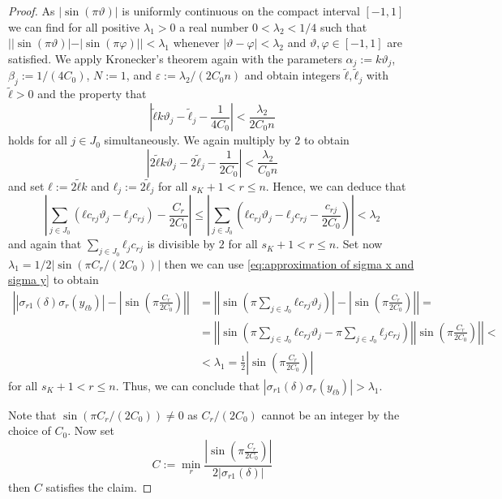 \begin{proof}
  As \(|\sin(π ϑ)|\) is uniformly continuous on the compact interval \([-1, 1]\)
  we can find for all positive \(λ_1 > 0\) a real number \(0 < λ_2 < 1/4\) such
  that \(||\sin(π ϑ)| - |\sin(π φ)|| < λ_1\) whenever \(|ϑ - φ| < λ_2\) and
  \(ϑ, φ ∈ [-1, 1]\) are satisfied. We apply Kronecker's theorem again with the
  parameters \(α_j := k ϑ_j\), \(β_j := 1/(4 C_0)\), \(N := 1\), and \(ε := λ_2
  / (2 C_0 n)\) and obtain integers \(\tilde{ℓ}, \tilde{ℓ}_j\) with \(\tilde{ℓ}
  > 0\) and the property that
  \[
    \left\vert \tilde{ℓ} k ϑ_j - \tilde{ℓ}_j - \frac{1}{4 C_0}\right\vert
     < \frac{λ_2}{2 C_0 n}
  \]
  holds for all \(j ∈ J_0\) simultaneously. We again multiply by \(2\) to obtain
  \[
  \left\vert 2 \tilde{ℓ} k ϑ_j - 2 \tilde{ℓ}_j - \frac{1}{2 C_0}\right\vert
    < \frac{λ_2}{C_0 n}
  \]
  and set \(ℓ := 2 \tilde{ℓ} k\) and \(ℓ_j := 2 \tilde{ℓ}_j\) for all \(s_K + 1
  < r ≤ n\). Hence, we can deduce that
  \[
    \left|
      \sum_{j ∈ J_0} \left( ℓ c_{rj} ϑ_j - ℓ_j c_{rj}\right) - \frac{C_r}{2 C_0}
    \right| ≤
    \left|
      \sum_{j ∈ J_0}
        \left( ℓ c_{rj} ϑ_j - ℓ_j c_{rj} - \frac{c_{rj}}{2 C_0}\right)
    \right| < λ_2
  \]
  and again that \(\sum_{j ∈ J_0}ℓ_j c_{rj}\) is divisible by \(2\) for all
  \(s_K + 1 < r ≤ n\). Set now \(λ_1 = 1/2 | \sin(π C_r / (2 C_0))|\) then we
  can use \eqref{eq:approximation of sigma x and sigma y} to obtain
  \begin{align*}
    \left\vert
      |σ_{r1}(δ) σ_r (y_{ℓb})| -
        \left| \sin\left( π \frac{C_r}{2 C_0} \right)\right|
    \right\vert &=
      \left|\left|
          \sin \left(π \sum_{j ∈ J_0} ℓ c_{rj} ϑ_j \right)
        \right| -
        \left\vert \sin\left( π \frac{C_r}{2 C_0} \right)\right\vert
       \right\vert=\\
      &= \left|\left| \sin \left(π \sum_{j ∈ J_0} ℓ c_{rj} ϑ_j  -
              π \sum_{j ∈ J_0}ℓ_j c_{rj}\right)
          \right|
          \left\vert \sin\left( π \frac{C_r}{2 C_0} \right)\right\vert
        \right| <\\
      &< λ_1 = \frac{1}{2} \left| \sin \left( π \frac{C_r}{2 C_0}\right)\right|
  \end{align*}
  for all \(s_K + 1 < r ≤ n\). Thus, we can conclude that \(|σ_{r1}(δ) σ_r
  (y_{ℓb})| > λ_1\).

  Note that \(\sin(π C_r / (2 C_0)) ≠ 0\) as \(C_r / (2 C_0)\) cannot be an
  integer by the choice of \(C_0\). Now set
  \[
    C :=
      \min_{r}
        \frac{\left|
          \sin \left(π \frac{C_r}{2 C_0}\right)
        \right|}{2 |σ_{r1}(δ)|}
  \]
  then \(C\) satisfies the claim.
\end{proof}

